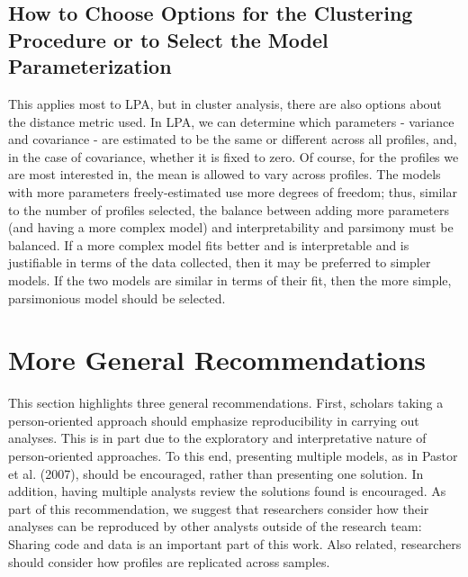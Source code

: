 \documentclass[man]{apa6}
\begin{document}
\subsection{How to Choose Options for the Clustering Procedure or to
Select the Model
Parameterization}\label{how-to-choose-options-for-the-clustering-procedure-or-to-select-the-model-parameterization}

This applies most to LPA, but in cluster analysis, there are also
options about the distance metric used. In LPA, we can determine which
parameters - variance and covariance - are estimated to be the same or
different across all profiles, and, in the case of covariance, whether
it is fixed to zero. Of course, for the profiles we are most interested
in, the mean is allowed to vary across profiles. The models with more
parameters freely-estimated use more degrees of freedom; thus, similar
to the number of profiles selected, the balance between adding more
parameters (and having a more complex model) and interpretability and
parsimony must be balanced. If a more complex model fits better and is
interpretable and is justifiable in terms of the data collected, then it
may be preferred to simpler models. If the two models are similar in
terms of their fit, then the more simple, parsimonious model should be
selected.

\section{More General
Recommendations}\label{more-general-recommendations}

This section highlights three general recommendations. First, scholars
taking a person-oriented approach should emphasize reproducibility in
carrying out analyses. This is in part due to the exploratory and
interpretative nature of person-oriented approaches. To this end,
presenting multiple models, as in Pastor et al. (2007), should be
encouraged, rather than presenting one solution. In addition, having
multiple analysts review the solutions found is encouraged. As part of
this recommendation, we suggest that researchers consider how their
analyses can be reproduced by other analysts outside of the research
team: Sharing code and data is an important part of this work. Also
related, researchers should consider how profiles are replicated across
samples.
\end{document}
